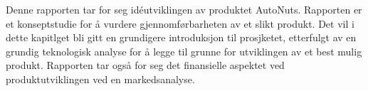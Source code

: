 Denne rapporten tar for seg idéutviklingen av produktet AutoNuts. Rapporten er 
et konseptstudie for å vurdere gjennomførbarheten av et slikt produkt. Det vil 
i dette kapitlget bli gitt en grundigere introduksjon til prosjketet, etterfulgt 
av en grundig teknologisk analyse for å legge til grunne for utviklingen 
av et best mulig produkt. Rapporten tar også for seg det finansielle aspektet ved 
produktutviklingen ved en markedsanalyse.